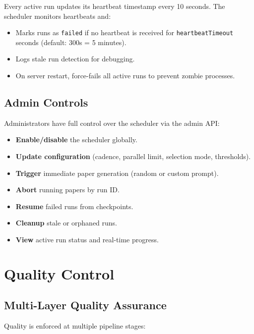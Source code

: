 Every active run updates its heartbeat timestamp every 10 seconds.
The scheduler monitors heartbeats and:

\begin{itemize}
  \item Marks runs as \texttt{failed} if no heartbeat is received for \texttt{heartbeatTimeout} seconds (default: 300s = 5 minutes).
  \item Logs stale run detection for debugging.
  \item On server restart, force-fails all active runs to prevent zombie processes.
\end{itemize}

\subsection{Admin Controls}

Administrators have full control over the scheduler via the admin API:

\begin{itemize}
  \item \textbf{Enable/disable} the scheduler globally.
  \item \textbf{Update configuration} (cadence, parallel limit, selection mode, thresholds).
  \item \textbf{Trigger} immediate paper generation (random or custom prompt).
  \item \textbf{Abort} running papers by run ID.
  \item \textbf{Resume} failed runs from checkpoints.
  \item \textbf{Cleanup} stale or orphaned runs.
  \item \textbf{View} active run status and real-time progress.
\end{itemize}

\section{Quality Control}
\label{sec:journal:quality}

\subsection{Multi-Layer Quality Assurance}

Quality is enforced at multiple pipeline stages:

